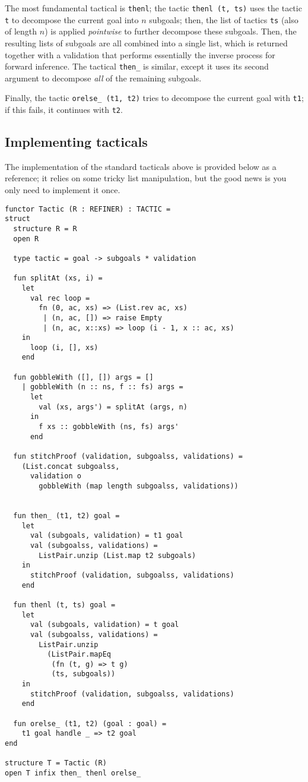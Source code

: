 \documentclass{article}
\theoremstyle{definition}
\theoremstyle{remark}
\begin{document}
The most fundamental tactical is \verb|thenl|; the tactic
\verb|thenl (t, ts)| uses the tactic \verb|t| to decompose the current
goal into $n$ subgoals; then, the list of tactics \verb|ts| (also of
length $n$) is applied \emph{pointwise} to further decompose these
subgoals. Then, the resulting lists of subgoals are all combined into
a single list, which is returned together with a validation that
performs essentially the inverse process for forward inference. The
tactical \verb|then_| is similar, except it uses its second argument
to decompose \emph{all} of the remaining subgoals.

Finally, the tactic \verb|orelse_ (t1, t2)| tries to decompose the
current goal with \verb|t1|; if this fails, it continues with
\verb|t2|.

\subsection{Implementing tacticals}

The implementation of the standard tacticals above is provided below
as a reference; it relies on some tricky list manipulation, but the
good news is you only need to implement it once.

\begin{verbatim}
functor Tactic (R : REFINER) : TACTIC =
struct
  structure R = R
  open R

  type tactic = goal -> subgoals * validation

  fun splitAt (xs, i) =
    let
      val rec loop =
        fn (0, ac, xs) => (List.rev ac, xs)
         | (n, ac, []) => raise Empty
         | (n, ac, x::xs) => loop (i - 1, x :: ac, xs)
    in
      loop (i, [], xs)
    end

  fun gobbleWith ([], []) args = []
    | gobbleWith (n :: ns, f :: fs) args =
      let
        val (xs, args') = splitAt (args, n)
      in
        f xs :: gobbleWith (ns, fs) args'
      end

  fun stitchProof (validation, subgoalss, validations) =
    (List.concat subgoalss,
      validation o
        gobbleWith (map length subgoalss, validations))


  fun then_ (t1, t2) goal =
    let
      val (subgoals, validation) = t1 goal
      val (subgoalss, validations) =
        ListPair.unzip (List.map t2 subgoals)
    in
      stitchProof (validation, subgoalss, validations)
    end

  fun thenl (t, ts) goal =
    let
      val (subgoals, validation) = t goal
      val (subgoalss, validations) =
        ListPair.unzip
          (ListPair.mapEq
           (fn (t, g) => t g)
           (ts, subgoals))
    in
      stitchProof (validation, subgoalss, validations)
    end

  fun orelse_ (t1, t2) (goal : goal) =
    t1 goal handle _ => t2 goal
end

structure T = Tactic (R)
open T infix then_ thenl orelse_
\end{verbatim}
\end{document}
